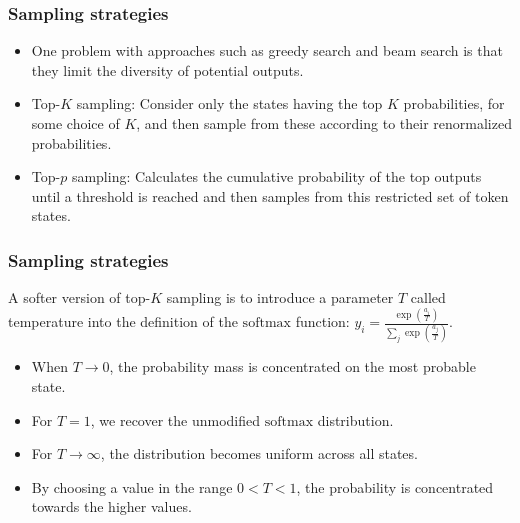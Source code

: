 \documentclass{beamer}
\begin{document}
\begin{frame}
    \frametitle{Sampling strategies}
    \begin{itemize}
        \item One problem with approaches such as greedy search and beam search is that they limit the diversity of potential outputs.
        \item Top-$K$ sampling: Consider only the states having the top $K$ probabilities, for some choice of $K$, and then sample from these according to their renormalized probabilities.
        \item Top-$p$ sampling: Calculates the cumulative probability of the top outputs until a threshold is reached and then samples from this restricted set of token states.
    \end{itemize}
\end{frame}

\begin{frame}
    \frametitle{Sampling strategies}
    A softer version of top-$K$ sampling is to introduce a parameter $T$ called temperature into the definition of the $\mathrm{softmax}$ function: $y_{i}=\frac{\exp(\frac{a_{i}}{T})}{\sum_{j}\exp(\frac{a_{j}}{T})}$.
    \begin{itemize}
        \item When $T\to{}0$, the probability mass is concentrated on the most probable state.
        \item For $T=1$, we recover the unmodified $\mathrm{softmax}$ distribution.
        \item For $T\to\infty$, the distribution becomes uniform across all states.
        \item By choosing a value in the range $0<T<1$, the probability is concentrated towards the higher values.
    \end{itemize}
\end{frame}
\end{document}
